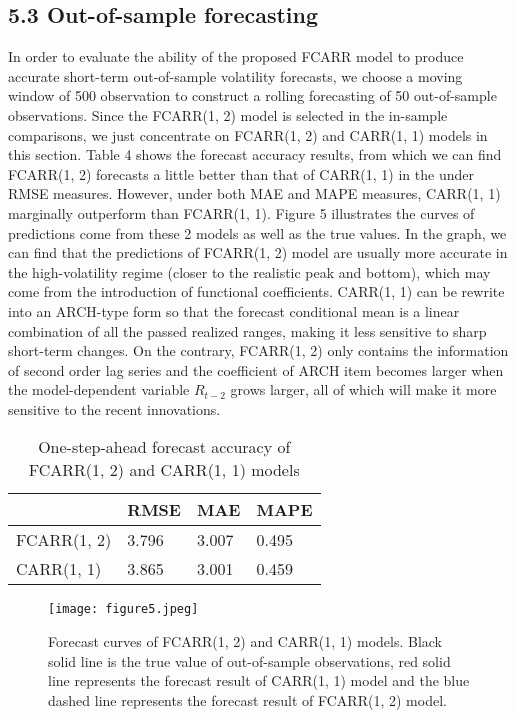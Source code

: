 \documentclass[
journal=jacsat, %
manuscript=article]{achemso}
\begin{document}
\begin{CJK*}{UTF8}{song}
\subsection{5.3  Out-of-sample forecasting}
In order to evaluate the ability of the proposed FCARR model to produce accurate short-term out-of-sample volatility forecasts, we choose a moving window of 500 observation to construct a rolling forecasting of 50 out-of-sample observations. Since the FCARR(1, 2) model is selected in the in-sample comparisons, we just concentrate on FCARR(1, 2) and CARR(1, 1) models in this section. Table 4 shows the forecast accuracy results, from which we can find FCARR(1, 2) forecasts a little better than that of CARR(1, 1) in the under RMSE measures. However, under both MAE and MAPE measures, CARR(1, 1) marginally outperform than FCARR(1, 1). Figure 5 illustrates the curves of predictions come from these 2 models as well as the true values. In the graph, we can find that the predictions of FCARR(1, 2) model are usually more accurate in the high-volatility regime (closer to the realistic peak and bottom), which may come from the introduction of functional coefficients. CARR(1, 1) can be rewrite into an ARCH-type form so that the forecast conditional mean is a linear combination of all the passed realized ranges, making it less sensitive to sharp short-term changes. On the contrary, FCARR(1, 2) only contains the information of second order lag series and the coefficient of ARCH item becomes larger when the model-dependent variable $R_{t-2}$ grows larger, all of which will make it more sensitive to the recent innovations.
\begin{table}[H]
\begin{center}
\captionsetup{format=plain, labelfont=bf, singlelinecheck=off, labelsep=newline}
\caption{One-step-ahead forecast accuracy of FCARR(1, 2) and CARR(1, 1) models}
\begin{tabular}{L{0.3\textwidth}C{0.2\textwidth}C{0.2\textwidth}C{0.2\textwidth}}
\hline
& RMSE & MAE & MAPE\\
\hline
FCARR(1, 2)	& 3.796	& 3.007	& 0.495\\
CARR(1, 1)	& 3.865	& 3.001	& 0.459\\
\hline
\end{tabular}
\end{center}
\end{table}

\begin{figure}[H]
\centering
\texttt{[image: figure5.jpeg]}\\
\captionsetup{justification=raggedright, singlelinecheck=off}
\caption{Forecast curves of FCARR(1, 2) and CARR(1, 1) models. Black solid line is the true value of out-of-sample observations, red solid line represents the forecast result of CARR(1, 1) model and the blue dashed line represents the forecast result of FCARR(1, 2) model.}
\end{figure}


\end{CJK*}
\end{document}
